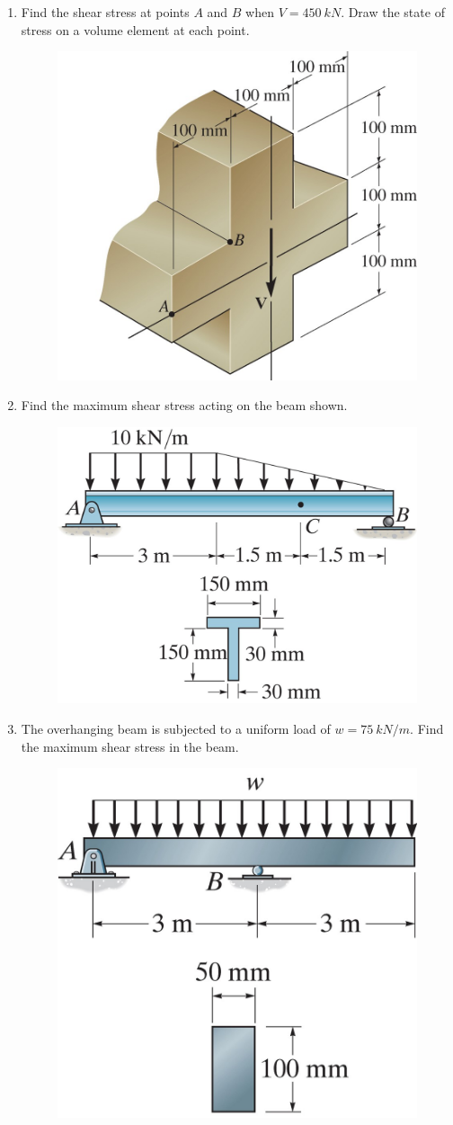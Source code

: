 \documentclass[12pt, oneside]{article}
\begin{document}
\begin{enumerate}
	\item %
		Find the shear stress at points $A$ and $B$ when $V = 	\SI{450}{kN} $.
		Draw the state of stress on a volume element at each point.
		\begin{figure}[H]
			\centering
			\includegraphics[width=0.6\linewidth]{f7-2}
		\end{figure}
	\item %
		Find the maximum shear stress acting on the beam shown.
		\begin{figure}[H]
			\centering
			\includegraphics[width=0.6\linewidth]{7-25}
		\end{figure}
	\item %
		The overhanging beam is subjected to a uniform load of $w= 	\SI{75}{kN/m} $.
		Find the maximum shear stress in the beam.
		\begin{figure}[H]
			\centering
			\includegraphics[width=0.5\linewidth]{7-11}

\end{figure}
\end{enumerate}
\end{document}
